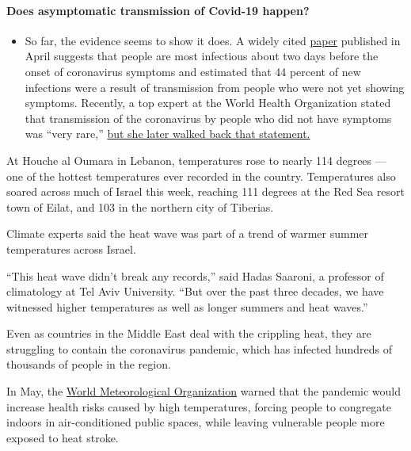 \begin{itemize}
{  \paragraph{Does asymptomatic transmission of Covid-19
  happen?}\label{does-asymptomatic-transmission-of-covid-19-happen}}

  \begin{itemize}
  \tightlist
  \item
    So far, the evidence seems to show it does. A widely cited
    \href{https://www.nature.com/articles/s41591-020-0869-5}{paper}
    published in April suggests that people are most infectious about
    two days before the onset of coronavirus symptoms and estimated that
    44 percent of new infections were a result of transmission from
    people who were not yet showing symptoms. Recently, a top expert at
    the World Health Organization stated that transmission of the
    coronavirus by people who did not have symptoms was ``very rare,''
    \href{https://www.nytimes3xbfgragh.onion/2020/06/09/world/coronavirus-updates.html?action=click\&pgtype=Article\&state=default\&region=MAIN_CONTENT_3\&context=storylines_faq\#link-1f302e21}{but
    she later walked back that statement.}
  \end{itemize}
\end{itemize}

At Houche al Oumara in Lebanon, temperatures rose to nearly 114 degrees
--- one of the hottest temperatures ever recorded in the country.
Temperatures also soared across much of Israel this week, reaching 111
degrees at the Red Sea resort town of Eilat, and 103 in the northern
city of Tiberias.

Climate experts said the heat wave was part of a trend of warmer summer
temperatures across Israel.

``This heat wave didn't break any records,'' said Hadas Saaroni, a
professor of climatology at Tel Aviv University. ``But over the past
three decades, we have witnessed higher temperatures as well as longer
summers and heat waves.''

Even as countries in the Middle East deal with the crippling heat, they
are struggling to contain the coronavirus pandemic, which has infected
hundreds of thousands of people in the region.

In May, the
\href{https://public.wmo.int/en/media/news/global-partnership-urges-stronger-preparation-hot-weather-during-covid-19}{World
Meteorological Organization} warned that the pandemic would increase
health risks caused by high temperatures, forcing people to congregate
indoors in air-conditioned public spaces, while leaving vulnerable
people more exposed to heat stroke.

